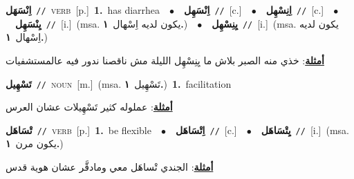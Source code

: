 \documentclass[10pt,a4paper,twoside]{article} %
\begin{document}
\begin{multicols}{2}
{\setlength\topsep{0pt}\textbf{\foreignlanguage{arabic}{اِنْسَهَل}}\ {\color{gray}\texttt{//}\color{black}}\ \textsc{verb}\ [p.]\ \textbf{1.}~has diarrhea\ \ $\bullet$\ \ \setlength\topsep{0pt}\textbf{\foreignlanguage{arabic}{اِنْسَهِل}}\ {\color{gray}\texttt{//}\color{black}}\ [c.]\ \ $\bullet$\ \ \setlength\topsep{0pt}\textbf{\foreignlanguage{arabic}{اِنِسْهِل}}\ {\color{gray}\texttt{//}\color{black}}\ [c.]\ \ $\bullet$\ \ \setlength\topsep{0pt}\textbf{\foreignlanguage{arabic}{يِنْسَهِل}}\ {\color{gray}\texttt{//}\color{black}}\ [i.]\ \color{gray}(msa. \foreignlanguage{arabic}{يكون لديه اِسْهال}~\foreignlanguage{arabic}{\textbf{١.}})\color{black}\ \ $\bullet$\ \ \setlength\topsep{0pt}\textbf{\foreignlanguage{arabic}{يِنِسْهِل}}\ {\color{gray}\texttt{//}\color{black}}\ [i.]\ \color{gray}(msa. \foreignlanguage{arabic}{يكون لديه اِسْهال}~\foreignlanguage{arabic}{\textbf{١.}})\color{black}\  \begin{flushright}\color{gray}\foreignlanguage{arabic}{\textbf{\underline{\foreignlanguage{arabic}{أمثلة}}}: خذي منه الصبر بلاش ما يِنِسْهِل الليلة مش ناقصنا ندور فيه عالمستشفيات}\end{flushright}\color{black}} \vspace{2mm}

{\setlength\topsep{0pt}\textbf{\foreignlanguage{arabic}{تَسْهِيل}}\ {\color{gray}\texttt{//}\color{black}}\ \textsc{noun}\ [m.]\ \color{gray}(msa. \foreignlanguage{arabic}{تَسْهِيل}~\foreignlanguage{arabic}{\textbf{١.}})\color{black}\ \textbf{1.}~facilitation\  \begin{flushright}\color{gray}\foreignlanguage{arabic}{\textbf{\underline{\foreignlanguage{arabic}{أمثلة}}}: عملوله كثير تَسْهِيلات عشان العرس}\end{flushright}\color{black}} \vspace{2mm}

{\setlength\topsep{0pt}\textbf{\foreignlanguage{arabic}{تْسَاهَل}}\ {\color{gray}\texttt{//}\color{black}}\ \textsc{verb}\ [p.]\ \textbf{1.}~be flexible\ \ $\bullet$\ \ \setlength\topsep{0pt}\textbf{\foreignlanguage{arabic}{اِتْسَاهَل}}\ {\color{gray}\texttt{//}\color{black}}\ [c.]\ \ $\bullet$\ \ \setlength\topsep{0pt}\textbf{\foreignlanguage{arabic}{يِتْسَاهَل}}\ {\color{gray}\texttt{//}\color{black}}\ [i.]\ \color{gray}(msa. \foreignlanguage{arabic}{يكون مرن}~\foreignlanguage{arabic}{\textbf{١.}})\color{black}\  \begin{flushright}\color{gray}\foreignlanguage{arabic}{\textbf{\underline{\foreignlanguage{arabic}{أمثلة}}}: الجندي تْساهَل معي ومادقَّر عشان هوية قدس}\end{flushright}\color{black}} \vspace{2mm}


\end{multicols}
\end{document}
